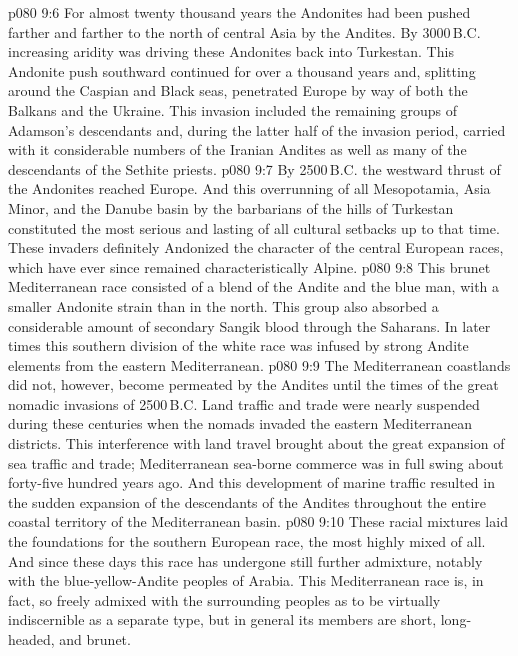 \vs p080 9:6 For almost twenty thousand years the Andonites had been pushed farther and farther to the north of central Asia by the Andites. By 3000\,B.C. increasing aridity was driving these Andonites back into Turkestan. This Andonite push southward continued for over a thousand years and, splitting around the Caspian and Black seas, penetrated Europe by way of both the Balkans and the Ukraine. This invasion included the remaining groups of Adamson’s descendants and, during the latter half of the invasion period, carried with it considerable numbers of the Iranian Andites as well as many of the descendants of the Sethite priests.
\vs p080 9:7 By 2500\,B.C. the westward thrust of the Andonites reached Europe. And this overrunning of all Mesopotamia, Asia Minor, and the Danube basin by the barbarians of the hills of Turkestan constituted the most serious and lasting of all cultural setbacks up to that time. These invaders definitely Andonized the character of the central European races, which have ever since remained characteristically Alpine.
\vs p080 9:8 \pc {}\bibnobreakspace {} This brunet Mediterranean race consisted of a blend of the Andite and the blue man, with a smaller Andonite strain than in the north. This group also absorbed a considerable amount of secondary Sangik blood through the Saharans. In later times this southern division of the white race was infused by strong Andite elements from the eastern Mediterranean.
\vs p080 9:9 The Mediterranean coastlands did not, however, become permeated by the Andites until the times of the great nomadic invasions of 2500\,B.C. Land traffic and trade were nearly suspended during these centuries when the nomads invaded the eastern Mediterranean districts. This interference with land travel brought about the great expansion of sea traffic and trade; Mediterranean sea\hyp{}borne commerce was in full swing about forty\hyp{}five hundred years ago. And this development of marine traffic resulted in the sudden expansion of the descendants of the Andites throughout the entire coastal territory of the Mediterranean basin.
\vs p080 9:10 These racial mixtures laid the foundations for the southern European race, the most highly mixed of all. And since these days this race has undergone still further admixture, notably with the blue\hyp{}yellow\hyp{}Andite peoples of Arabia. This Mediterranean race is, in fact, so freely admixed with the surrounding peoples as to be virtually indiscernible as a separate type, but in general its members are short, long\hyp{}headed, and brunet.
